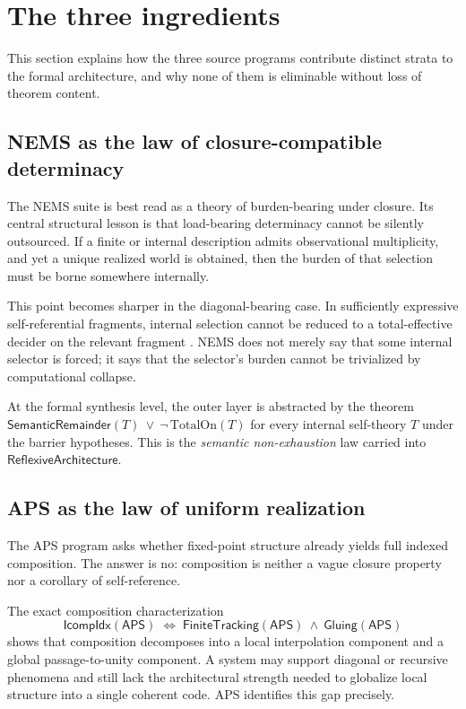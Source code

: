 \documentclass[11pt]{article}
\newcommand{\APS}{\ensuremath{\mathsf{APS}}}
\newcommand{\FinTrack}{\ensuremath{\mathsf{FiniteTracking}}}
\newcommand{\Glue}{\ensuremath{\mathsf{Gluing}}}
\newcommand{\Comp}{\ensuremath{\mathsf{IcompIdx}}}
\newcommand{\SemRem}{\ensuremath{\mathsf{SemanticRemainder}}}
\newcommand{\RAL}{\ensuremath{\mathsf{ReflexiveArchitecture}}}
\begin{document}
\section{The three ingredients}
\label{sec:ingredients}

This section explains how the three source programs contribute distinct strata to the
formal architecture, and why none of them is eliminable without loss of theorem content.

\subsection{NEMS as the law of closure-compatible determinacy}

The NEMS suite \cite{SpivackNEMS01-2026,SpivackNEMS08-2026,SpivackNEMS11-2026,
SpivackNEMS81-2026} is best read as a theory of burden-bearing under closure.  Its
central structural lesson is that load-bearing determinacy cannot be silently outsourced.
If a finite or internal description admits observational multiplicity, and yet a unique
realized world is obtained, then the burden of that selection must be borne somewhere
internally.

This point becomes sharper in the diagonal-bearing case.  In sufficiently expressive
self-referential fragments, internal selection cannot be reduced to a total-effective
decider on the relevant fragment \cite{SpivackNEMS11-2026}.  NEMS does not merely say
that some internal selector is forced; it says that the selector's burden cannot be
trivialized by computational collapse.

At the formal synthesis level, the outer layer is abstracted by the theorem
\(
\SemRem(T)\ \lor\ \neg\, \mathrm{TotalOn}(T)
\)
for every internal self-theory $T$ under the barrier hypotheses.  This is the
\emph{semantic non-exhaustion} law carried into $\RAL$.

\subsection{APS as the law of uniform realization}

The APS program \cite{SpivackAPS2026} asks whether fixed-point structure already yields
full indexed composition.  The answer is no: composition is neither a vague closure
property nor a corollary of self-reference.

The exact composition characterization
\[
\Comp(\APS)
\;\Longleftrightarrow\;
\FinTrack(\APS)\ \wedge\ \Glue(\APS)
\]
shows that composition decomposes into a local interpolation component and a global
passage-to-unity component.  A system may support diagonal or recursive phenomena and
still lack the architectural strength needed to globalize local structure into a single
coherent code.  APS identifies this gap precisely.
\end{document}
